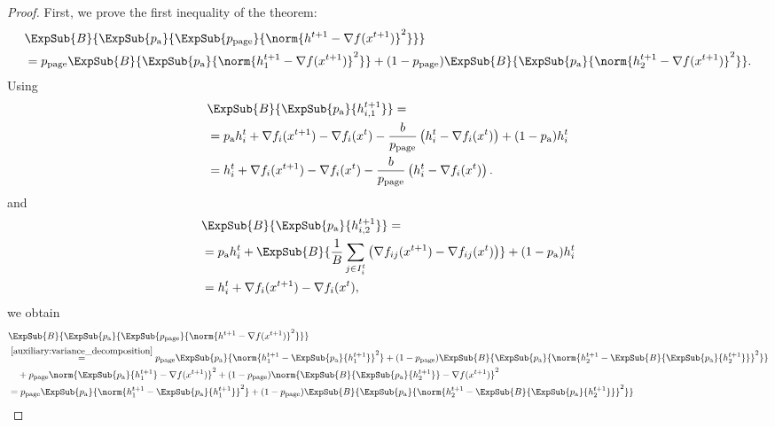 \documentclass{article}
\newcommand*{\probavailable}{\ensuremath{p_{\textnormal{a}}}}
\newcommand*{\probpage}{\ensuremath{p_{\text{page}}}}
\begin{document}
\begin{proof}
  First, we prove the first inequality of the theorem:
  \begin{align*}
    &\ExpSub{B}{\ExpSub{\probavailable}{\ExpSub{\probpage}{\norm{h^{t+1} - \nabla f(x^{t+1})}^2}}} \\
    &=\probpage\ExpSub{B}{\ExpSub{\probavailable}{\norm{h^{t+1}_{1} - \nabla f(x^{t+1})}^2}} + (1 - \probpage)\ExpSub{B}{\ExpSub{\probavailable}{\norm{h^{t+1}_{2} - \nabla f(x^{t+1})}^2}}.\\
  \end{align*}
  Using 
  \begin{align*}
    &\ExpSub{B}{\ExpSub{\probavailable}{h^{t+1}_{i,1}}} = \\
    &=\probavailable h^t_i +  \nabla f_i(x^{t+1}) - \nabla f_i(x^{t}) - \frac{b}{\probpage} \left(h^t_i - \nabla f_i(x^{t})\right) + (1 - \probavailable) h^t_i \\
    &= h^t_i + \nabla f_i(x^{t+1}) - \nabla f_i(x^{t}) - \frac{b}{\probpage} \left(h^t_i - \nabla f_i(x^{t})\right).
  \end{align*}
  and 
  \begin{align*}
    &\ExpSub{B}{\ExpSub{\probavailable}{h^{t+1}_{i,2}}} = \\
    &=\probavailable h^t_i +  \ExpSub{B}{\frac{1}{B}\sum_{j \in I^t_i}\left(\nabla f_{ij}(x^{t+1}) - \nabla f_{ij}(x^{t})\right)} + (1 - \probavailable) h^t_i \\
    &= h^t_i + \nabla f_i(x^{t+1}) - \nabla f_i(x^{t}),
  \end{align*}
  we obtain
  \begin{align}
    &\ExpSub{B}{\ExpSub{\probavailable}{\ExpSub{\probpage}{\norm{h^{t+1} - \nabla f(x^{t+1})}^2}}} \nonumber\\
    &\overset{\eqref{auxiliary:variance_decomposition}}{=}\probpage\ExpSub{\probavailable}{\norm{h^{t+1}_{1} - \ExpSub{\probavailable}{h^{t+1}_{1}}}^2} + (1 - \probpage)\ExpSub{B}{\ExpSub{\probavailable}{\norm{h^{t+1}_{2} - \ExpSub{B}{\ExpSub{\probavailable}{h^{t+1}_{2}}}}^2}} \nonumber\\
    &\quad +\probpage\norm{\ExpSub{\probavailable}{h^{t+1}_{1}} - \nabla f(x^{t+1})}^2 + (1 - \probpage)\norm{\ExpSub{B}{\ExpSub{\probavailable}{h^{t+1}_{2}}} - \nabla f(x^{t+1})}^2 \nonumber \\
    &=\probpage\ExpSub{\probavailable}{\norm{h^{t+1}_{1} - \ExpSub{\probavailable}{h^{t+1}_{1}}}^2} + (1 - \probpage)\ExpSub{B}{\ExpSub{\probavailable}{\norm{h^{t+1}_{2} - \ExpSub{B}{\ExpSub{\probavailable}{h^{t+1}_{2}}}}^2}} \nonumber\\

\end{align}
\end{proof}
\end{document}
